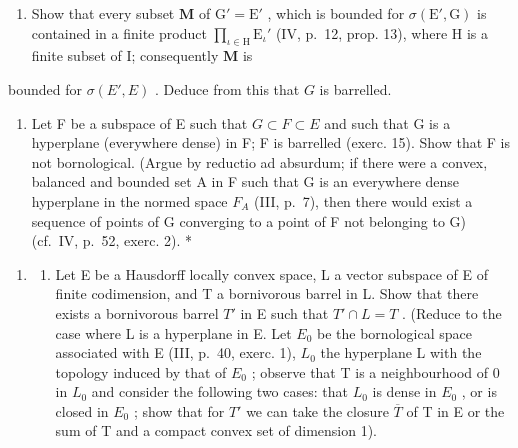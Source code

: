 \begin{enumerate}
\def\labelenumi{\alph{enumi})}
\tightlist
\item
  Show that every subset \(\mathbf{M}\) of \(\mathrm{G}' = \mathrm{E}'\) , which is bounded for \(\sigma(\mathrm{E}', \mathrm{G})\) is contained in a finite product \(\prod_{\iota \in \mathrm{H}} \mathrm{E}_{\iota}'\) (IV, p.~12, prop. 13), where \(\mathrm{H}\) is a finite subset of I; consequently \(\mathbf{M}\) is
\end{enumerate}

bounded for \(\sigma(E', E)\) . Deduce from this that \(G\) is barrelled.

\begin{enumerate}
\def\labelenumi{\alph{enumi})}
\setcounter{enumi}{1}
\tightlist
\item
  Let F be a subspace of E such that \(G \subset F \subset E\) and such that G is a hyperplane (everywhere dense) in F; F is barrelled (exerc. 15). Show that F is not bornological. (Argue by reductio ad absurdum; if there were a convex, balanced and bounded set A in F such that G is an everywhere dense hyperplane in the normed space \(F_{A}\) (III, p.~7), then there would exist a sequence of points of G converging to a point of F not belonging to G) (cf.~IV, p.~52, exerc. 2). *
\end{enumerate}

\begin{enumerate}
\def\labelenumi{\arabic{enumi})}
\setcounter{enumi}{16}
\tightlist
\item
  \begin{enumerate}
  \def\labelenumii{\alph{enumii})}
  \tightlist
  \item
    Let E be a Hausdorff locally convex space, L a vector subspace of E of finite codimension, and T a bornivorous barrel in L. Show that there exists a bornivorous barrel \(T'\) in E such that \(T' \cap L = T\) . (Reduce to the case where L is a hyperplane in E. Let \(E_{0}\) be the bornological space associated with E (III, p.~40, exerc. 1), \(L_{0}\) the hyperplane L with the topology induced by that of \(E_{0}\) ; observe that T is a neighbourhood of 0 in \(L_{0}\) and consider the following two cases: that \(L_{0}\) is dense in \(E_{0}\) , or is closed in \(E_{0}\) ; show that for \(T'\) we can take the closure \(\overline{T}\) of T in E or the sum of T and a compact convex set of dimension 1).
  \end{enumerate}
\end{enumerate}

